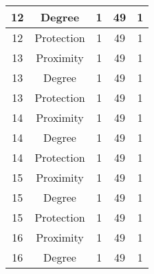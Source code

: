 \documentclass[results.tex]{subfiles}
\begin{document}
\begin{center}
\begin{tabular}{| c || c | c | c | c |}
            \hline
            12                      & Degree                       & 1                      & 49                      & 1                    \\
            \hline
            12                      & Protection                   & 1                      & 49                      & 1                    \\
            \hline
            13                      & Proximity                    & 1                      & 49                      & 1                    \\
            \hline
            13                      & Degree                       & 1                      & 49                      & 1                    \\
            \hline
            13                      & Protection                   & 1                      & 49                      & 1                    \\
            \hline
            14                      & Proximity                    & 1                      & 49                      & 1                    \\
            \hline
            14                      & Degree                       & 1                      & 49                      & 1                    \\
            \hline
            14                      & Protection                   & 1                      & 49                      & 1                    \\
            \hline
            15                      & Proximity                    & 1                      & 49                      & 1                    \\
            \hline
            15                      & Degree                       & 1                      & 49                      & 1                    \\
            \hline
            15                      & Protection                   & 1                      & 49                      & 1                    \\
            \hline
            16                      & Proximity                    & 1                      & 49                      & 1                    \\
            \hline
            16                      & Degree                       & 1                      & 49                      & 1                    \\

\end{tabular}
\end{center}
\end{document}
